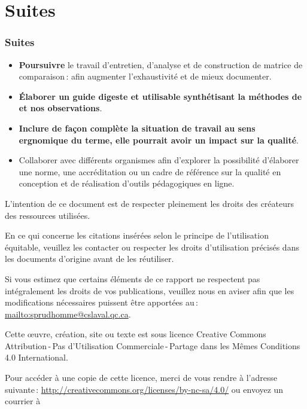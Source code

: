 					\section{Suites} 
						\begin{frame}[allowframebreaks]
						\frametitle{Suites}
                        			
                        			\begin{itemize}
                        			\item \textbf{Poursuivre} le travail d’entretien, d’analyse et de construction de matrice de comparaison\,: afin augmenter l’exhaustivité et de mieux documenter.
                        			\item \textbf{Élaborer un guide digeste et utilisable synthétisant la méthodes de \citet{bonneau2013a} et nos observations}.
                        			\item \textbf{Inclure de façon complète la situation de travail au sens ergnomique du terme, elle pourrait avoir un impact sur la qualité}.
						\item Collaborer avec différents organismes afin d’explorer la possibilité d’élaborer une norme, une accréditation ou un cadre de référence sur la qualité en conception et de réalisation d’outils pédagogiques en ligne.
                        				
						\end{itemize}
						\end{frame}									
						
\framebreak
\par L’intention de ce document est de respecter pleinement les droits des créateurs des ressources
utilisées.
	\par En ce qui concerne les citations insérées selon le principe de l'utilisation équitable, veuillez les contacter ou respecter les droits d’utilisation précisés dans les documents d’origine avant de les réutiliser.
	\par Si vous estimez que certains éléments de ce rapport ne respectent pas intégralement les droits de vos
publications, veuillez nous en aviser afin que les modifications nécessaires puissent être apportées au\,: \url{mailto:sprudhomme@cslaval.qc.ca}.
	\par Cette \oe uvre, création, site ou texte est sous licence Creative Commons Attribution\,-\,Pas d’Utilisation Commerciale\,-\,Partage dans les Mêmes Conditions 4.0 International. \\
	\par 
	 Pour accéder à une copie de cette licence, merci de vous rendre à l'adresse suivante\,: \url{http://creativecommons.org/licenses/by-nc-sa/4.0/} ou envoyez un courrier à 

